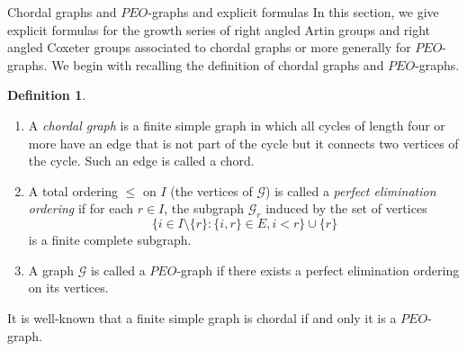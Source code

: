 \documentclass[11pt,reqno]{amsart}
\makeatletter
\numberwithin{equation}{section} %
\theoremstyle{definition}
\newtheorem{defn}{Definition}
\theoremstyle{remark}
\numberwithin{equation}{section}
\def\section{\def\@secnumfont{\mdseries}\@startsection{section}{1}%
  \z@{.7\linespacing\@plus\linespacing}{.5\linespacing}%
  {\normalfont\scshape\centering}}
\makeatother
\begin{document}
\section{Chordal graphs and $PEO$-graphs and explicit formulas}\label{sect6}
In this section, we give explicit formulas for the growth series of right angled Artin groups and right angled Coxeter groups associated to chordal graphs or more generally for $PEO$-graphs. 
We begin with recalling the definition of chordal graphs and $PEO$-graphs. 
\begin{defn}
\begin{enumerate}
    \item 
    A \textit{chordal graph} is a finite simple graph in which all cycles of length four or more have an edge that is not
part of the cycle but it connects two vertices of the cycle. Such an edge is called a chord. 
\item A total ordering $\leq $ on $I$ (the vertices of $\mathcal{G}$) is called a \textit{perfect elimination ordering} if for each $r\in I$, the subgraph $\mathcal{G}_r$ induced by the set of vertices 
 $$\{i\in I\setminus \{r\}: \{i,r\}\in E, i<r\}\cup \{r\}$$ 
 is a finite complete subgraph. 
 
 \item A graph $\mathcal{G}$ is called a $PEO$-graph if there exists a perfect elimination ordering on its vertices.

\end{enumerate}
\end{defn}
It is well-known that a finite simple graph is chordal if and only it is a $PEO$-graph. 
\end{document}
